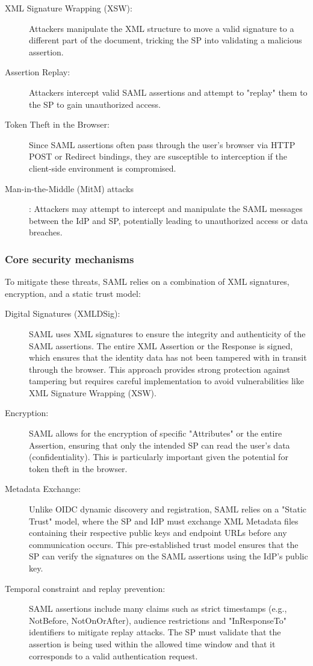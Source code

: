 \documentclass[../memoire.tex]{subfiles}
\begin{document}
\begin{description}
  \item[XML Signature Wrapping (XSW):] Attackers manipulate the XML structure to move a valid signature to a different part of the document, tricking the SP into validating a malicious assertion.
  \item[Assertion Replay:] Attackers intercept valid SAML assertions and attempt to "replay" them to the SP to gain unauthorized access.
  \item[Token Theft in the Browser:] Since SAML assertions often pass through the user's browser via HTTP POST or Redirect bindings, they are susceptible to interception if the client-side environment is compromised.
  \item[Man-in-the-Middle (MitM) attacks]: Attackers may attempt to intercept and manipulate the SAML messages between the IdP and SP, potentially leading to unauthorized access or data breaches.
\end{description}

\subsubsection*{Core security mechanisms}

To mitigate these threats, SAML relies on a combination of XML signatures, encryption, and a static trust model:
\begin{description}
  \item[Digital Signatures (XMLDSig):] SAML uses XML signatures to ensure the integrity and authenticity of the SAML assertions. The entire XML Assertion or the Response is signed, which ensures that the identity data has not been tampered with in transit through the browser. This approach provides strong protection against tampering but requires careful implementation to avoid vulnerabilities like XML Signature Wrapping (XSW).
  \item[Encryption:] SAML allows for the encryption of specific "Attributes" or the entire Assertion, ensuring that only the intended SP can read the user's data (confidentiality). This is particularly important given the potential for token theft in the browser.
  \item[Metadata Exchange:] Unlike OIDC dynamic discovery and registration, SAML relies on a "Static Trust" model, where the SP and IdP must exchange XML Metadata files containing their respective public keys and endpoint URLs before any communication occurs. This pre-established trust model ensures that the SP can verify the signatures on the SAML assertions using the IdP's public key.
  \item[Temporal constraint and replay prevention:] SAML assertions include many claims such as strict timestamps (e.g., NotBefore, NotOnOrAfter), audience restrictions and "InResponseTo" identifiers to mitigate replay attacks. The SP must validate that the assertion is being used within the allowed time window and that it corresponds to a valid authentication request.
\end{description}
\end{document}
